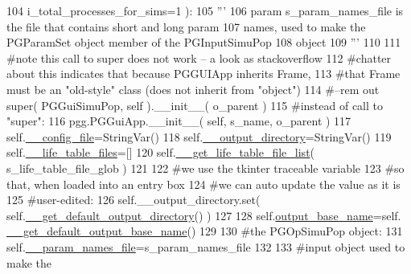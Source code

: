 \begin{DoxyCode}
104                             i\_total\_processes\_for\_sims=1 ):
105         \textcolor{stringliteral}{'''}
106 \textcolor{stringliteral}{        param s\_param\_names\_file is the file that contains short and long param}
107 \textcolor{stringliteral}{        names, used to make the PGParamSet object  member of the PGInputSimuPop }
108 \textcolor{stringliteral}{        object}
109 \textcolor{stringliteral}{        '''}
110 
111         \textcolor{comment}{#note this call to super does not work -- a look as stackoverflow}
112         \textcolor{comment}{#chatter about this indicates that because PGGUIApp inherits Frame,}
113         \textcolor{comment}{#that Frame must be an "old-style" class (does not inherit from "object")}
114         \textcolor{comment}{#--rem out super( PGGuiSimuPop, self ).\_\_init\_\_( o\_parent )}
115         \textcolor{comment}{#instead of call to "super":}
116         pgg.PGGuiApp.\_\_init\_\_( self, s\_name, o\_parent )
117         self.\hyperlink{classnegui_1_1pgguisimupop_1_1PGGuiSimuPop_accf4b1e619efda180dcd4795425f88c8}{\_\_config\_file}=StringVar()
118         self.\hyperlink{classnegui_1_1pgguisimupop_1_1PGGuiSimuPop_a8c3dba3a47984c6174e659458da1d4c6}{\_\_output\_directory}=StringVar()
119         self.\hyperlink{classnegui_1_1pgguisimupop_1_1PGGuiSimuPop_a1871547ce6fe9a86b10a30f3d7b41cdd}{\_\_life\_table\_files}=[]
120         self.\hyperlink{classnegui_1_1pgguisimupop_1_1PGGuiSimuPop_a12344f4fdce230b8fbb699dbd74c95a2}{\_\_get\_life\_table\_file\_list}( s\_life\_table\_file\_glob )
121 
122         \textcolor{comment}{#we use the tkinter traceable variable}
123         \textcolor{comment}{#so that, when loaded into an entry box}
124         \textcolor{comment}{#we can auto update the value as it is }
125         \textcolor{comment}{#user-edited:}
126         self.\_\_output\_directory.set( self.\hyperlink{classnegui_1_1pgguisimupop_1_1PGGuiSimuPop_abba3f28989d693eadf8d8dd181502d06}{\_\_get\_default\_output\_directory}() )
127 
128         self.\hyperlink{classnegui_1_1pgguisimupop_1_1PGGuiSimuPop_aa5f9f17f0527c20e5556b574a3f97300}{output\_base\_name}=self.
      \hyperlink{classnegui_1_1pgguisimupop_1_1PGGuiSimuPop_a55130312327d03aa8e37d827a46929db}{\_\_get\_default\_output\_base\_name}() 
129 
130         \textcolor{comment}{#the PGOpSimuPop object:}
131         self.\hyperlink{classnegui_1_1pgguisimupop_1_1PGGuiSimuPop_a53d091be0140a85e8c45a76c0b89c370}{\_\_param\_names\_file}=s\_param\_names\_file
132 
133         \textcolor{comment}{#input object used to make the}

\end{DoxyCode}
